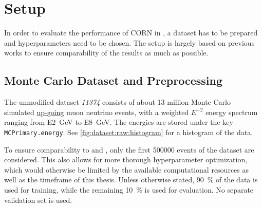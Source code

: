 \section{Setup}
In order to evaluate the performance of \ac{CORN} in \dsea{},
a dataset has to be prepared
and hyperparameters need to be chosen.
%
The setup is largely based on previous works
  \cite{dsea_jan, dsea_samuel}
to ensure comparability of the results
  as much as possible.


\subsection{Monte Carlo Dataset and Preprocessing}
%
%
The unmodified dataset \emph{11374} \cite{icecube_mc} consists of about 13 million Monte Carlo simulated
  \hyperref[sec:neutrino_astronomy:icecube:up_going]{up-going}
  muon neutrino events,
with a weighted $E^{-2}$ energy spectrum
ranging from \SI{E2}{\giga\electronvolt} to \SI{E8}{\giga\electronvolt}.
The energies are stored under the key \texttt{MCPrimary.energy}.
See \autoref{fig:dataset:raw:histogram} for a histogram of the data.

To ensure comparability to \cite{dsea_jan} and \cite{dsea_samuel}, %
only the first \num{500000} events of the dataset are considered.
This also allows for more thorough hyperparameter optimization,
which would otherwise be limited by
  the available computational resources
  as well as the timeframe of this thesis.
%
Unless otherwise stated, %
\SI{90}{\percent} of the data is used for training,
while the remaining \SI{10}{\percent} is used for evaluation.
No separate validation set is used.


